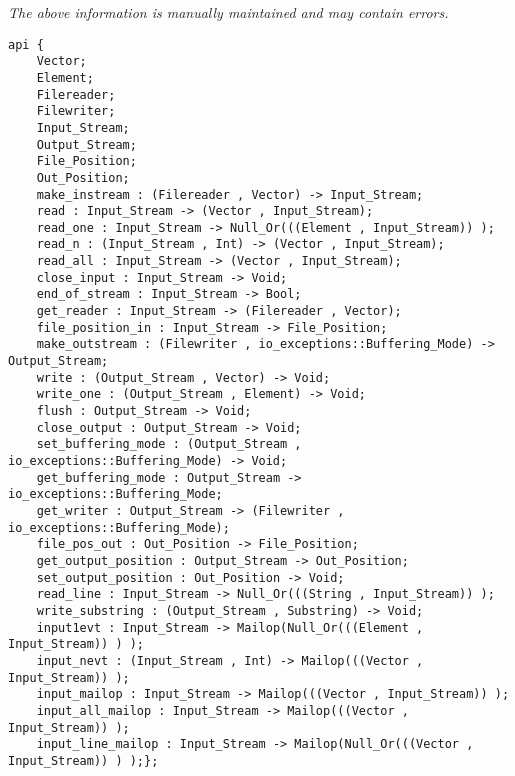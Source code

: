 \label{api:Winix\_Pure\_Text\_File\_For\_Os}

{\tiny \it The above information is manually maintained and may contain errors.}
\begin{verbatim}
api {
    Vector;
    Element;
    Filereader;
    Filewriter;
    Input_Stream;
    Output_Stream;
    File_Position;
    Out_Position;
    make_instream : (Filereader , Vector) -> Input_Stream;
    read : Input_Stream -> (Vector , Input_Stream);
    read_one : Input_Stream -> Null_Or(((Element , Input_Stream)) );
    read_n : (Input_Stream , Int) -> (Vector , Input_Stream);
    read_all : Input_Stream -> (Vector , Input_Stream);
    close_input : Input_Stream -> Void;
    end_of_stream : Input_Stream -> Bool;
    get_reader : Input_Stream -> (Filereader , Vector);
    file_position_in : Input_Stream -> File_Position;
    make_outstream : (Filewriter , io_exceptions::Buffering_Mode) -> Output_Stream;
    write : (Output_Stream , Vector) -> Void;
    write_one : (Output_Stream , Element) -> Void;
    flush : Output_Stream -> Void;
    close_output : Output_Stream -> Void;
    set_buffering_mode : (Output_Stream , io_exceptions::Buffering_Mode) -> Void;
    get_buffering_mode : Output_Stream -> io_exceptions::Buffering_Mode;
    get_writer : Output_Stream -> (Filewriter , io_exceptions::Buffering_Mode);
    file_pos_out : Out_Position -> File_Position;
    get_output_position : Output_Stream -> Out_Position;
    set_output_position : Out_Position -> Void;
    read_line : Input_Stream -> Null_Or(((String , Input_Stream)) );
    write_substring : (Output_Stream , Substring) -> Void;
    input1evt : Input_Stream -> Mailop(Null_Or(((Element , Input_Stream)) ) );
    input_nevt : (Input_Stream , Int) -> Mailop(((Vector , Input_Stream)) );
    input_mailop : Input_Stream -> Mailop(((Vector , Input_Stream)) );
    input_all_mailop : Input_Stream -> Mailop(((Vector , Input_Stream)) );
    input_line_mailop : Input_Stream -> Mailop(Null_Or(((Vector , Input_Stream)) ) );};
\end{verbatim}
